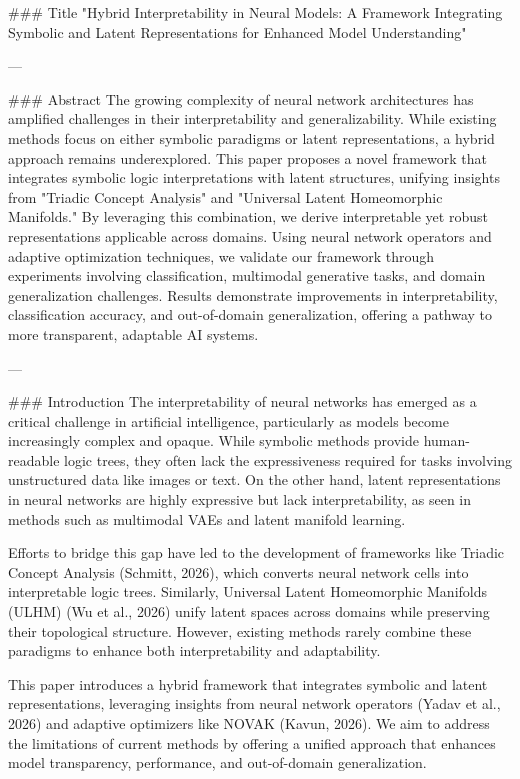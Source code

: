 ### Title
"Hybrid Interpretability in Neural Models: A Framework Integrating Symbolic and Latent Representations for Enhanced Model Understanding"

---

### Abstract
The growing complexity of neural network architectures has amplified challenges in their interpretability and generalizability. While existing methods focus on either symbolic paradigms or latent representations, a hybrid approach remains underexplored. This paper proposes a novel framework that integrates symbolic logic interpretations with latent structures, unifying insights from "Triadic Concept Analysis" and "Universal Latent Homeomorphic Manifolds." By leveraging this combination, we derive interpretable yet robust representations applicable across domains. Using neural network operators and adaptive optimization techniques, we validate our framework through experiments involving classification, multimodal generative tasks, and domain generalization challenges. Results demonstrate improvements in interpretability, classification accuracy, and out-of-domain generalization, offering a pathway to more transparent, adaptable AI systems. 

---

### Introduction
The interpretability of neural networks has emerged as a critical challenge in artificial intelligence, particularly as models become increasingly complex and opaque. While symbolic methods provide human-readable logic trees, they often lack the expressiveness required for tasks involving unstructured data like images or text. On the other hand, latent representations in neural networks are highly expressive but lack interpretability, as seen in methods such as multimodal VAEs and latent manifold learning.

Efforts to bridge this gap have led to the development of frameworks like Triadic Concept Analysis (Schmitt, 2026), which converts neural network cells into interpretable logic trees. Similarly, Universal Latent Homeomorphic Manifolds (ULHM) (Wu et al., 2026) unify latent spaces across domains while preserving their topological structure. However, existing methods rarely combine these paradigms to enhance both interpretability and adaptability.

This paper introduces a hybrid framework that integrates symbolic and latent representations, leveraging insights from neural network operators (Yadav et al., 2026) and adaptive optimizers like NOVAK (Kavun, 2026). We aim to address the limitations of current methods by offering a unified approach that enhances model transparency, performance, and out-of-domain generalization.

